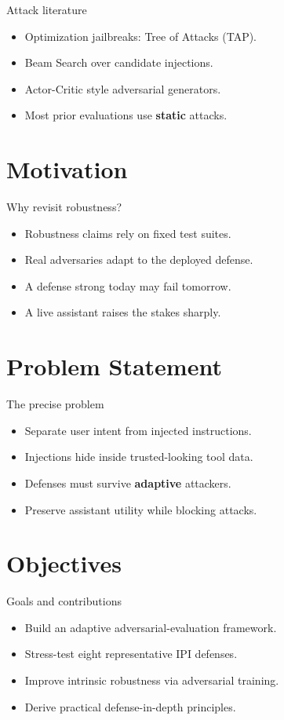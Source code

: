 \documentclass{beamer}
\begin{document}
\begin{frame}{Attack literature}
\begin{itemize}
\item Optimization jailbreaks: Tree of Attacks (TAP).
\item Beam Search over candidate injections.
\item Actor-Critic style adversarial generators.
\item Most prior evaluations use \textbf{static} attacks.
\end{itemize}
\end{frame}

\section{Motivation}
\begin{frame}{Why revisit robustness?}
\begin{itemize}
\item Robustness claims rely on fixed test suites.
\item Real adversaries adapt to the deployed defense.
\item A defense strong today may fail tomorrow.
\item A live assistant raises the stakes sharply.
\end{itemize}
\end{frame}

\section{Problem Statement}
\begin{frame}{The precise problem}
\begin{itemize}
\item Separate user intent from injected instructions.
\item Injections hide inside trusted-looking tool data.
\item Defenses must survive \textbf{adaptive} attackers.
\item Preserve assistant utility while blocking attacks.
\end{itemize}
\end{frame}

\section{Objectives}
\begin{frame}{Goals and contributions}
\begin{itemize}
\item Build an adaptive adversarial-evaluation framework.
\item Stress-test eight representative IPI defenses.
\item Improve intrinsic robustness via adversarial training.
\item Derive practical defense-in-depth principles.
\end{itemize}
\end{frame}
\end{document}
